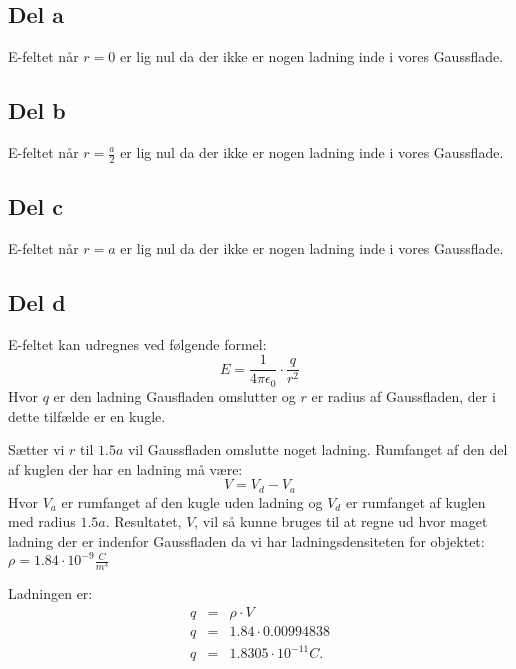 \subsection{Del a} %
\label{sub:del_a}
E-feltet når $r = 0$ er lig nul da der ikke er nogen ladning inde i vores Gaussflade.

\subsection{Del b} %
\label{sub:del_b}
E-feltet når $r = \frac{a}{2}$ er lig nul da der ikke er nogen ladning inde i vores Gaussflade.

\subsection{Del c} %
\label{sub:del_c}
E-feltet når $r = a$ er lig nul da der ikke er nogen ladning inde i vores Gaussflade.

\subsection{Del d} %
\label{sub:del_d}
E-feltet kan udregnes ved følgende formel:
\begin{equation}
	E = \frac{1}{4\pi \epsilon _0} \cdot \frac{q}{r^2}
\end{equation}
Hvor $q$ er den ladning Gausfladen omslutter og $r$ er radius af Gaussfladen, der i dette tilfælde er en kugle.

Sætter vi $r$ til $1.5a$ vil Gaussfladen omslutte noget ladning. Rumfanget af den del af kuglen der har en ladning må være:
\begin{equation}
	V = V_d - V_a
\end{equation}
Hvor $V_a$ er rumfanget af den kugle uden ladning og $V_d$ er rumfanget af kuglen med radius $1.5a$. Resultatet, $V$, vil så kunne bruges til at regne ud hvor maget ladning der er indenfor Gaussfladen da vi har ladningsdensiteten for objektet: $\rho = 1.84 \cdot 10^{-9}\frac{C}{m^3}$

Ladningen er:
\begin{eqnarray}
	q &=& \rho \cdot V \\
	q &=& 1.84 \cdot 0.00994838 \\
	q &=& 1.8305 \cdot 10^{-11} C. 
\end{eqnarray}

